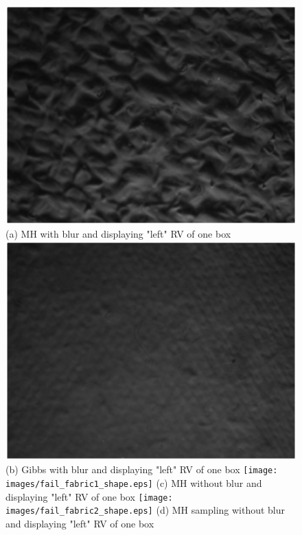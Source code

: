 \documentclass[10pt,twocolumn,letterpaper]{article}
\begin{document}
\begin{figure}[t]
\includegraphics[width=\textwidth]{images/fail_fabric_lbp.eps}
{\small (a) MH with blur and displaying "left" RV of one box}
\endminipage\hfill
{}
\includegraphics[width=\textwidth]{images/fail_fabric2_lbp.eps}
{\small (b) Gibbs with blur and displaying "left" RV of one box}
\endminipage\hfill
{}
\texttt{[image: images/fail\_fabric1\_shape.eps]}
{\small (c) MH without blur and displaying "left" RV of one box}
\endminipage\hfill
{}
\texttt{[image: images/fail\_fabric2\_shape.eps]}
{\small (d) MH sampling without blur and displaying "left" RV of one box}
\endminipage\\


\end{figure}
\end{document}
